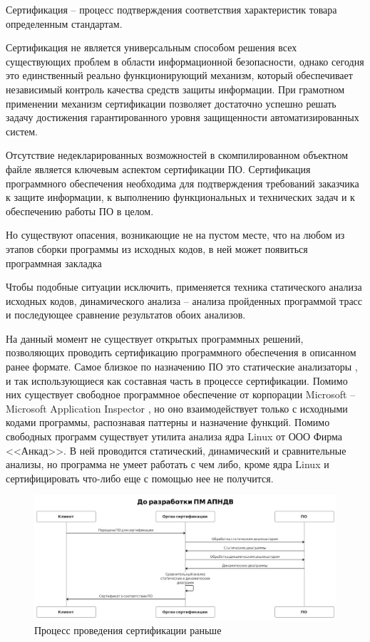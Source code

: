Сертификация -- процесс подтверждения соответствия характеристик товара определенным стандартам.

Сертификация не является универсальным способом 
решения всех существующих проблем в 
области информационной безопасности, однако 
сегодня это единственный реально функционирующий 
механизм, который обеспечивает независимый 
контроль качества средств защиты информации.
При грамотном применении механизм сертификации 
позволяет достаточно успешно решать задачу 
достижения гарантированного уровня защищенности автоматизированных систем.

{\actuality} Отсутствие недекларированных возможностей в скомпилированном
объектном файле является ключевым аспектом сертификации ПО.
Сертификация программного обеспечения необходима для 
подтверждения требований заказчика к защите 
информации, к выполнению функциональных 
и технических задач и к обеспечению работы ПО в целом.

Но существуют опасения, возникающие не на пустом месте,
что на любом из этапов сборки программы из
исходных кодов, в ней может появиться программная 
закладка \autocite{compile-a-virus, ken-thompson-hack}

Чтобы подобные ситуации исключить, применяется техника статического 
анализа исходных кодов, динамического анализа -- анализа пройденных 
программой трасс и последующее сравнение результатов обоих анализов.

На данный момент не существует открытых программных решений,
позволяющих проводить сертификацию программного обеспечения в описанном ранее формате.
Самое близкое по назначению ПО это статические анализаторы \autocite{c-static-analysis},
и так использующиеся как составная часть в процессе сертификации.
Помимо них существует свободное программное обеспечение от корпорации Microsoft --
Microsoft Application Inspector \autocite{microsoft-application-inspector}, но оно
взаимодействует только с исходными кодами программы, распознавая паттерны и назначение
функций.
Помимо свободных программ существует утилита анализа ядра Linux от ООО Фирма <<Анкад>>. 
В ней проводится статический, динамический и сравнительные анализы, но программа не умеет
работать с чем либо, кроме ядра Linux и сертифицировать что-либо еще с помощью нее не получится.

\begin{figure}[!htbp]
    \includegraphics[width=\textwidth,height=\textheight,keepaspectratio]{images/uml_before_cropped.png}
    \caption{Процесс проведения сертификации раньше\label{fig:how-cert-was-before}}
\end{figure}

